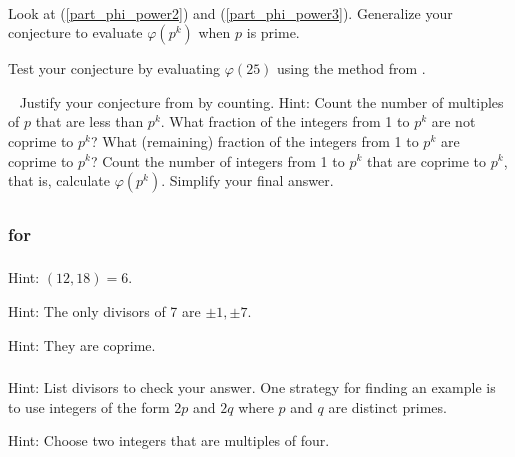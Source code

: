 \begin{exer}[\exerE] %
\label{exer_conj_phi_powerp}
~
    \begin{exerpart}
        \item Look at  (\ref{part_phi_power2}) and (\ref{part_phi_power3}).  Generalize your conjecture to evaluate $\varphi(p^k)$ when $p$ is prime.
        \item Test your conjecture by evaluating $\varphi(25)$ using the method from .
    \end{exerpart}
\end{exer}

\begin{exer}[\exerE] %
\label{exer_prove_conj_phi_powerp}
~
    Justify your conjecture from  by counting.  Hint: Count the number of multiples of $p$ that are less than $p^k$.  What fraction of the integers from 1 to $p^k$ are not coprime to $p^k$?  What (remaining) fraction of the integers from 1 to $p^k$ are coprime to $p^k$?  Count the number of integers from 1 to $p^k$ that are coprime to $p^k$, that is, calculate $\varphi(p^k)$.  Simplify your final answer.
\end{exer}

\subsection{\answers}

\subsubsection{\answers for  \subgcd}

\subsubsection*{ \answers}
\begin{apart}
    \item Hint: $(12,18)=6$.
    \item Hint: The only divisors of 7 are $\pm1, \pm 7$.
    \item Hint: They are coprime.
\end{apart}

\subsubsection*{ \answers}
\begin{apart}
    \item Hint: List divisors to check your answer.  One strategy for finding an example is to use integers of the form $2p$ and $2q$ where $p$ and $q$ are distinct primes.
    \item Hint: Choose two integers that are multiples of four.
\end{apart}

